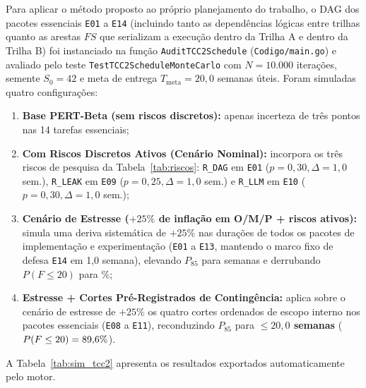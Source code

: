 \documentclass[12pt,openany,oneside,a4paper,english,brazilian,sumario=tradicional]{abntex2}
\begin{document}
Para aplicar o método proposto ao próprio planejamento do trabalho, o DAG dos pacotes essenciais \texttt{E01} a \texttt{E14} (incluindo tanto as dependências lógicas entre trilhas quanto as arestas $FS$ que serializam a execução dentro da Trilha A e dentro da Trilha B) foi instanciado na função \texttt{AuditTCC2Schedule} (\texttt{Codigo/main.go}) e avaliado pelo teste \texttt{TestTCC2ScheduleMonteCarlo} com $N=10.000$ iterações, semente $S_0=42$ e meta de entrega $T_{\mathrm{meta}} = 20{,}0$ semanas úteis. Foram simuladas quatro configurações:
\begin{enumerate}
  \item \textbf{Base PERT-Beta (sem riscos discretos):} apenas incerteza de três pontos nas 14 tarefas essenciais;
  \item \textbf{Com Riscos Discretos Ativos (Cenário Nominal):} incorpora os três riscos de pesquisa da Tabela~\ref{tab:riscos}: \texttt{R\_DAG} em \texttt{E01} ($p=0{,}30, \Delta=1{,}0$ sem.), \texttt{R\_LEAK} em \texttt{E09} ($p=0{,}25, \Delta=1{,}0$ sem.) e \texttt{R\_LLM} em \texttt{E10} ($p=0{,}30, \Delta=1{,}0$ sem.);
  \item \textbf{Cenário de Estresse ($+25\%$ de inflação em O/M/P + riscos ativos):} simula uma deriva sistemática de $+25\%$ nas durações de todos os pacotes de implementação e experimentação (\texttt{E01} a \texttt{E13}, mantendo o marco fixo de defesa \texttt{E14} em 1,0 semana), elevando $P_{85}$ para \tccDoisStressPoitentaeCinco{} semanas e derrubando $P(F \le 20)$ para \tccDoisStressProbVinte{}\%;
  \item \textbf{Estresse + Cortes Pré-Registrados de Contingência:} aplica sobre o cenário de estresse de $+25\%$ os quatro cortes ordenados de escopo interno nos pacotes essenciais (\texttt{E08} a \texttt{E11}), reconduzindo $P_{85}$ para \textbf{\tccDoisCutsPoitentaeCinco{} $\le 20{,}0$ semanas} ($P(F \le 20) = 89{,}6{}\%$).
\end{enumerate}

A Tabela~\ref{tab:sim_tcc2} apresenta os resultados exportados automaticamente pelo motor.
\end{document}
